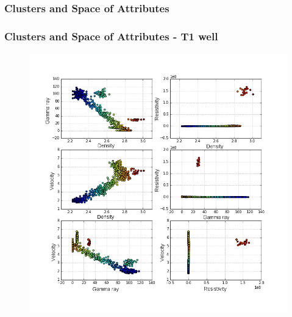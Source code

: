 \documentclass[aspectratio=10]{beamer} %
\begin{document}
%

\subsubsection{Clusters and Space of Attributes}

\begin{frame}
	\frametitle{Clusters and Space of Attributes - T1 well}
	    
	\begin{figure}
	 \includegraphics[scale=0.29]{Imagens/cluterpocoT1.png}
	\end{figure}
	
\end{frame}
\end{document}
